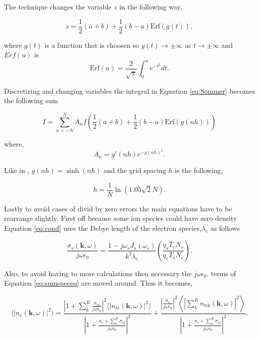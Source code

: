 \documentclass[10pt]{report}
\begin{document}
\noindent The technique changes the variable $z$ in the following way,

\begin{equation}
\label{eq:newz}
z = \frac{1}{2}(a+b)+\frac{1}{2} (b-a)\text{Erf}(g(t)),
\end{equation}

\noindent where $g(t)$ is a function that is choosen so  $g(t)\rightarrow\pm \infty$ as $t\rightarrow\pm \infty$ and $Erf(u)$ is 
\begin{equation}
\label{eq:erf1}
\text{Erf}(u) = \frac{2}{\sqrt{\pi}}\int_0^u e^{-t^2}dt.
\end{equation}

\noindent Discretizing and changing variables the integral in Equation \ref{eq:Sommer} becomes the following sum

\begin{equation}
\label{eq:erfsum1}
I=\displaystyle \sum_{n=-N}^N A_nf\left( \frac{1}{2}(a+b)+\frac{1}{2} (b-a)\text{Erf}(g(nh))\right)
\end{equation}

\noindent where,
\begin{equation}
\label{eq:anterm}
A_n = g'(nh)e^{-g(nh)^2}.
\end{equation}

\noindent Like in \cite{Ooi:2007jx}, $g(nh) = \sinh (nh)$ and the grid spacing $h$ is the following,

\begin{equation}
\label{eq:hterm}
h = \frac{1}{N}\ln(1.05\sqrt{2}N).
\end{equation} 


Lastly to avoid cases of divid by zero errors the main equations have to be rearrange slightly. First off because some ion species could have zero density Equation \ref{eq:cond} uses the Debye length of the electron species,$\lambda_e$ as follows

\begin{equation}
\label{eq:condnew}
\frac{\sigma_{s}(\mathbf{k},\omega)}{j\omega\epsilon_0} = \frac{1-j\omega_s J_s(\omega_s)}{k^2\lambda_e} \left(\frac{q_sT_eN_s}{q_eT_sN_e}\right).
\end{equation}

Also, to avoid having to more calculations then necessary the $j\omega\epsilon_0$. terms of Equation \ref{eq:sumspeceq} are moved around. Thus it becomes,

\begin{equation}
\label{eq:sumspeceqfinal}
\displaystyle \langle \left|n_e(\mathbf{k},\omega)\right|^2\rangle =  \frac{\left|1 +  \sum_k^K\frac{\sigma_{ik}}{j\omega\epsilon_0} \right|^2 \langle |n_{te}(\mathbf{k},\omega)|^2\rangle}{\left|1 +\frac{\sigma_e+ \sum_k^K\sigma_{ik}}{j\omega\epsilon_0} \right|^2} + \frac{\left| \frac{\sigma_e}{j\omega\epsilon_0} \right|^2\left \langle \left|\sum_k^Kn_{tik}(\mathbf{k},\omega)\right|^2\right\rangle}{\left|1 +\frac{\sigma_e+ \sum_k^K\sigma_{ik}}{j\omega\epsilon_0} \right|^2}.
\end{equation}
\end{document}

